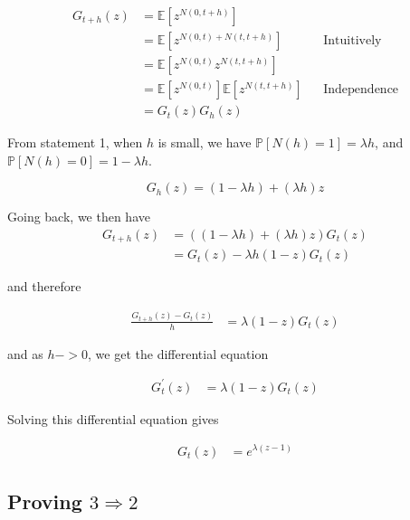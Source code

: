 \documentclass{article}
\begin{document}
\begin{align*}
G_{t+h}(z) &= \mathbb{E}[z^{N(0, t+h)}] \\
&= \mathbb{E}[z^{N(0, t) + N(t, t+h)}] && \text{Intuitively} \\
&= \mathbb{E}[z^{N(0, t)} z^{N(t, t+h)}] \\
&= \mathbb{E}[z^{N(0, t)}]  \mathbb{E}[z^{N(t, t+h)}] && \text{Independence} \\
&= G_t(z) G_h(z)
\end{align*}


From statement 1, when $h$ is small, we have $\mathbb{P}[N(h) = 1] = \lambda h$, and $\mathbb{P}[N(h) = 0] = 1 - \lambda h$. 

\begin{equation}
G_h(z) = (1 - \lambda h) + (\lambda h)z
\end{equation}

Going back, we then have 
\begin{align*}
G_{t+h}(z) &= ((1 - \lambda h) + (\lambda h)z) G_t(z) \\
&= G_t(z) - \lambda h(1-z) G_t(z)
\end{align*}

and therefore

\begin{align*}
\frac{G_{t+h}(z) - G_t(z)}{h} &= \lambda (1-z) G_t(z)
\end{align*}

and as $h -> 0$, we get the differential equation 

\begin{align*}
G_t^{\prime}(z) &= \lambda (1-z) G_t(z)
\end{align*}

Solving this differential equation gives 

\begin{align*}
G_t(z) &= e^{\lambda(z-1)}
\end{align*}







\subsection{Proving $3 \Rightarrow 2$}
\end{document}
